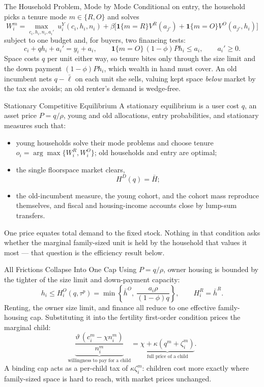 \documentclass[aspectratio=169,10pt]{beamer}
\providecommand{\1}{\mathbf 1}
\begin{document}
\begin{frame}{The Household Problem, Mode by Mode}
  Conditional on entry, the household picks a tenure mode $m\in\{R,O\}$ and solves
  \[
  W_i^m=\max_{c_i,h_i,n_i,a_i'}\ u_i^Y(c_i,h_i,n_i)+\beta\big[\1\{m=R\}V^R(a_{j'})+\1\{m=O\}V^O(a_{j'},h_i)\big]
  \]
  subject to one budget and, for buyers, two financing tests:
  \[
  c_i+q h_i+a_i'=y_i+a_i,\qquad
  \1\{m=O\}\,(1-\phi)P h_i\le a_i,\qquad a_i'\ge0.
  \]
  Space costs $q$ per unit either way, so tenure bites only through the size limit and the down payment $(1-\phi)P h_i$, which wealth in hand must cover. An old incumbent nets $q-\bar\ell$ on each unit she sells, valuing kept space \emph{below} market by the tax she avoids; an old renter's demand is wedge-free.
\end{frame}

\begin{frame}{Stationary Competitive Equilibrium}
  A stationary equilibrium is a user cost $q$, an asset price $P=q/\rho$, young and old allocations, entry probabilities, and stationary measures such that:
  \begin{itemize}
    \item young households solve their mode problems and choose tenure $o_i=\arg\max\{W_i^R,W_i^O\}$; old households and entry are optimal;
    \item the single floorspace market clears,
    \[
    H^D(q)=\bar H;
    \]
    \item the old-incumbent measure, the young cohort, and the cohort mass reproduce themselves, and fiscal and housing-income accounts close by lump-sum transfers.
  \end{itemize}
  One price equates total demand to the fixed stock. Nothing in that condition asks whether the marginal family-sized unit is held by the household that values it most --- that question is the efficiency result below.
\end{frame}

\begin{frame}{All Frictions Collapse Into One Cap}
  Using $P=q/\rho$, owner housing is bounded by the tighter of the size limit and down-payment capacity:
  \[
  h_i\le H_i^O(q,\tau^p)=\min\left\{\bar h^O,\ \frac{a_i\rho}{(1-\phi)q}\right\},
  \qquad H_i^R=\bar h^R.
  \]
  Renting, the owner size limit, and finance all reduce to one effective family-housing cap. Substituting it into the fertility first-order condition prices the marginal child:
  \[
  \underbrace{\frac{\vartheta\,(c_i^m-\chi n_i^m)}{n_i^m}}_{\text{willingness to pay for a child}}
  =
  \underbrace{\chi+\kappa(q^m+\zeta_i^m)}_{\text{full price of a child}} .
  \]
  A binding cap acts as a per-child tax of $\kappa\zeta_i^m$: children cost more exactly where family-sized space is hard to reach, with market prices unchanged.
\end{frame}
\end{document}
